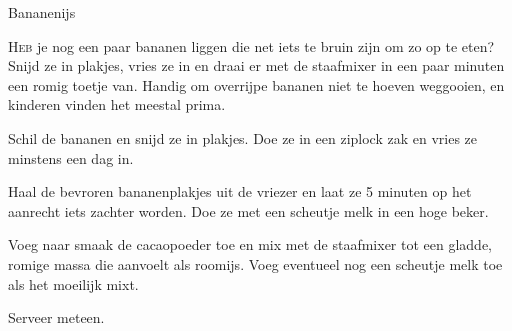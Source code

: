 \begin{recipe}{Bananenijs}


\lettrine{H}{eb} je nog een paar bananen liggen die net iets te bruin zijn om zo op
te eten? Snijd ze in plakjes, vries ze in en draai er met de staafmixer in een paar
minuten een romig toetje van. Handig om overrijpe bananen niet te hoeven weggooien,
en kinderen vinden het meestal prima.

\begin{ingredients}
\end{ingredients}

\begin{steps}
  \item Schil de bananen en snijd ze in plakjes. Doe ze in een ziplock zak en vries
        ze minstens een dag in.
  \item Haal de bevroren bananenplakjes uit de vriezer en laat ze 5 minuten op
        het aanrecht iets zachter worden. Doe ze met een scheutje melk in een
        hoge beker.
  \item Voeg naar smaak de cacaopoeder toe en mix met de staafmixer tot een
        gladde, romige massa die aanvoelt als roomijs. Voeg eventueel nog een
        scheutje melk toe als het moeilijk mixt.
  \item Serveer meteen.
\end{steps}
\end{recipe}
